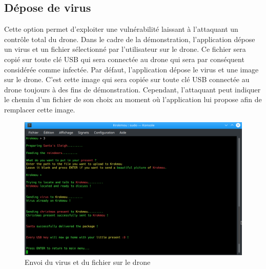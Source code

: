 \subsection{Dépose de virus}
Cette option permet d'exploiter une vulnérabilité laissant à l'attaquant un contrôle total du drone. Dans le cadre de la démonstration, l'application dépose un virus et un fichier sélectionné par l'utilisateur sur le drone. Ce fichier sera copié sur toute clé USB qui sera connectée au drone qui sera par conséquent considérée comme infectée. Par défaut, l'application dépose le virus et une image sur le drone. C'est cette image qui sera copiée sur toute clé USB connectée au drone toujours à des fins de démonstration. Cependant, l'attaquant peut indiquer le chemin d'un fichier de son choix au moment où l'application lui propose afin de remplacer cette image.

\begin{figure}[H]
  \centering
  \includegraphics[scale=0.3]{images/virus.png}
  \caption{Envoi du virus et du fichier sur le drone}
\end{figure}
